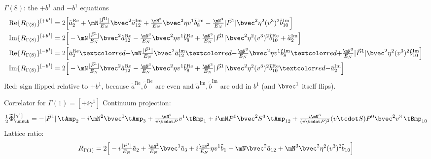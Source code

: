 \begin{frame}{$\Gamma(8)$: the $+b^1$ and $-b^1$ equations}
  \small
  \begin{align*}
    \Rr{Re}{8}{+b^1}&=2\Big[\aR2+\mN\tfrac{\Pa}{\En}\bvec^2\aI{12}+\tfrac{\mN^3}{\En}\bvec^2\eta v^1\bI8-\tfrac{\mN^3}{\En}\Pa\bvec^2\eta^2(v^3)^2\bI{10}\Big]\\
    \Rr{Im}{8}{+b^1}&=2\Big[-\mN\tfrac{\Pa}{\En}\bvec^2\aR{12}-\tfrac{\mN^3}{\En}\bvec^2\eta v^1\bR8+\tfrac{\mN^3}{\En}\Pa\bvec^2\eta^2(v^3)^2\bR{10}+\aI2\Big]\\
    \Rr{Re}{8}{-b^1}&=2\Big[\aR2\fl{-}\mN\tfrac{\Pa}{\En}\bvec^2\aI{12}\fl{-}\tfrac{\mN^3}{\En}\bvec^2\eta v^1\bI8\fl{+}\tfrac{\mN^3}{\En}\Pa\bvec^2\eta^2(v^3)^2\bI{10}\Big]\\
    \Rr{Im}{8}{-b^1}&=2\Big[-\mN\tfrac{\Pa}{\En}\bvec^2\aR{12}-\tfrac{\mN^3}{\En}\bvec^2\eta v^1\bR8+\tfrac{\mN^3}{\En}\Pa\bvec^2\eta^2(v^3)^2\bR{10}\fl{-}\aI2\Big]
  \end{align*}
  {\scriptsize Red: sign flipped relative to $+b^1$, because $\tilde a^{\text{Re}},\tilde b^{\text{Re}}$ are even and $\tilde a^{\text{Im}},\tilde b^{\text{Im}}$ are odd in $b^1$ (and $\bvec^1$ itself flips).}
\end{frame}

\begin{frame}{Correlator for $\Gamma(1)=[+i\gamma^1]$}
  \small
  Continuum projection:
  \[ \tfrac12\widetilde\Phi^{[\gamma^1]}_{\unsub}=-\Pa\,\tAmp_2-i\mN^2\bvec^1\tAmp_3+\tfrac{\mN^2}{v\tcdot P}v^1\tBmp_1+i\mN P^0\bvec^2S^3\,\tAmp_{12}+\tfrac{i\mN^3}{(v\tcdot P)^2}(v\tcdot S)P^0\bvec^2v^3\,\tBmp_{10} \]
  Lattice ratio:
  \[ R_{\Gamma(1)}=2\Big[-i\tfrac{\Pa}{\En}\tilde a_2+\tfrac{\mN^2}{\En}\bvec^1\tilde a_3+i\tfrac{\mN^2}{\En}\eta v^1\tilde b_1-\mN\bvec^2\tilde a_{12}+\mN^3\bvec^2\eta^2(v^3)^2\tilde b_{10}\Big] \]
\end{frame}

